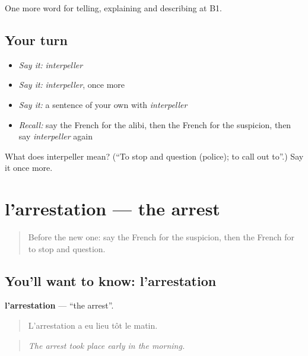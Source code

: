 \begin{grammarlens}[title={What you've built}]
One more word for telling, explaining and describing at B1.
\end{grammarlens}

\subsection*{Your turn}
\begin{itemize}
\raggedright
  \item \emph{Say it:} \emph{interpeller}
  \item \emph{Say it:} \emph{interpeller}, once more
  \item \emph{Say it:} a sentence of your own with \emph{interpeller}
  \item \emph{Recall:} say the French for the alibi, then the French for the suspicion, then say \emph{interpeller} again
\end{itemize}

\begin{tcolorbox}[breakable,colback=teal!4,colframe=teal!35!black,title={Before you move on}]
What does interpeller mean? (\textquotedblleft{}To stop and question (police); to call out to\textquotedblright{}.) Say it once more.
\end{tcolorbox}
\section[l'arrestation]{l'arrestation — the arrest}

\label{lesson:FR-C294-arrestation}



\begin{quote}
Before the new one: say the French for the suspicion, then the French for to stop and question.
\end{quote}

\subsection*{You'll want to know: l'arrestation}
\textbf{l'arrestation} — \textquotedblleft{}the arrest\textquotedblright{}.

\begin{quote}
L'arrestation a eu lieu tôt le matin.
\end{quote}

\begin{quote}
\emph{The arrest took place early in the morning.}
\end{quote}

